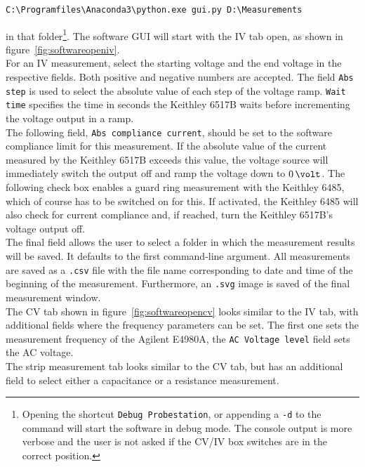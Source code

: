 \documentclass[a4paper]{article}
\begin{document}
\medskip
\begin{lstlisting}
C:\Programfiles\Anaconda3\python.exe gui.py D:\Measurements
\end{lstlisting}
\medskip

in that folder\footnote{Opening the shortcut {\tt Debug Probestation}, or appending a {\tt -d} to the command will start the software in debug mode.
The console output is more verbose and the user is not asked if the CV/IV box switches are in the correct position.}.
The software GUI will start with the IV tab open, as shown in figure~\ref{fig:softwareopeniv}.\\

For an IV measurement, select the starting voltage and the end voltage in the respective fields.
Both positive and negative numbers are accepted.
The field {\tt Abs step} is used to select the absolute value of each step of the voltage ramp.
{\tt Wait time} specifies the time in seconds the Keithley 6517B waits before incrementing the voltage output in a ramp.\\

The following field, {\tt Abs compliance current}, should be set to the software compliance limit for this measurement.
If the absolute value of the current measured by the Keithley 6517B exceeds this value, the voltage source will immediately switch the output off and ramp the voltage down to $0\,\volt$.
The following check box enables a guard ring measurement with the Keithley 6485, which of course has to be switched on for this.
If activated, the Keithley 6485 will also check for current compliance and, if reached, turn the Keithley 6517B's voltage output off.\\

The final field allows the user to select a folder in which the measurement results will be saved.
It defaults to the first command-line argument.
All measurements are saved as a {\tt .csv} file with the file name corresponding to date and time of the beginning of the measurement.
Furthermore, an {\tt .svg} image is saved of the final measurement window.\\

The CV tab shown in figure~\ref{fig:softwareopencv} looks similar to the IV tab, with additional fields where the frequency parameters can be set.
The first one sets the measurement frequency of the Agilent E4980A, the {\tt AC Voltage level} field sets the AC voltage.\\

The strip measurement tab looks similar to the CV tab, but has an additional field to select either a capacitance or a resistance measurement.\\
\end{document}
